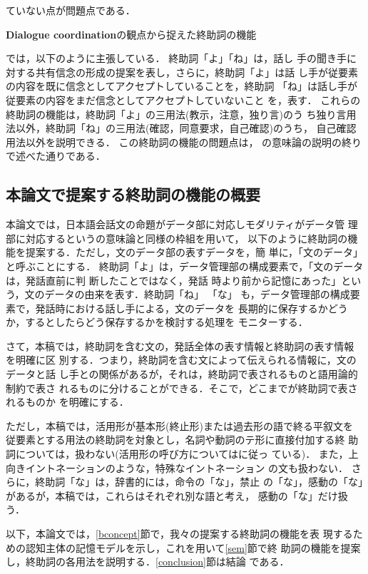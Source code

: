 ていない点が問題点である．
\begin{flushleft}
{\bf Dialogue coordination}{\dg の観点から捉えた終助詞の機能}\cite{katagiri93}
\end{flushleft}
\cite{katagiri93}では，以下のように主張している．  終助詞「よ」「ね」は，話し
手の聞き手に対する共有信念の形成の提案を表し，さらに，終助詞「よ」は話
し手が従要素の内容を既に信念としてアクセプトしていることを，終助詞
「ね」は話し手が従要素の内容をまだ信念としてアクセプトしていないこと
を，表す．  これらの終助詞の機能は，終助詞「よ」の三用法(教示，注意，独り言)のう
ち独り言用法以外，終助詞「ね」の三用法(確認，同意要求，自己確認)のうち，
自己確認用法以外を説明できる．  この終助詞の機能の問題点は，
\cite{kawamori91,kamio90}の意味論の説明の終りで述べた通りである．
\subsection{本論文で提案する終助詞の機能の概要}
本論文では，日本語会話文の命題がデータ部に対応しモダリティがデータ管
理部に対応するという\cite{kinsui93-3}の意味論と同様の枠組を用いて，
以下のように終助詞の機能を提案する．ただし，文のデータ部の表すデータを，簡
単に，「文のデータ」と呼ぶことにする．
終助詞「よ」は，データ管理部の構成要素で，「文のデータは，発話直前に判
断したことではなく，発話
時より前から記憶にあった」という，文のデータの由来を表す．終助詞「ね」
「な」
も，データ管理部の構成要素で，発話時における話し手による，文のデータを
長期的に保存するかどうか，するとしたらどう保存するかを検討する処理を
モニターする．

さて，本稿では，終助詞を含む文の，発話全体の表す情報と終助詞の表す情報
を明確に区
別する．つまり，終助詞を含む文によって伝えられる情報に，文のデータと話
し手との関係があるが，それは，終助詞で表されるものと語用論的制約で表さ
れるものに分けることができる．そこで，どこまでが終助詞で表されるものか
を明確にする．

ただし，本稿では，活用形が基本形(終止形)または過去形の語で終る平叙文を
従要素とする用法の終助詞を対象とし，名詞や動詞のテ形に直接付加する終
助詞については，扱わない(活用形の呼び方については\cite{katsuyou}に従っ
ている)．  また，上向きイントネーションのような，特殊なイントネーション
の文も扱わない．  さらに，終助詞「な」は，辞書的には，命令の「な」，禁止
の「な」，感動の「な」があるが，本稿では，これらはそれぞれ別な語と考え，
感動の「な」だけ扱う．

以下，本論文では，\ref{bconcept}節で，我々の提案する終助詞の機能を表
現するための認知主体の記憶モデルを示し，これを用いて\ref{sem}節で終
助詞の機能を提案し，終助詞の各用法を説明する．\ref{conclusion}節は結論
である．
